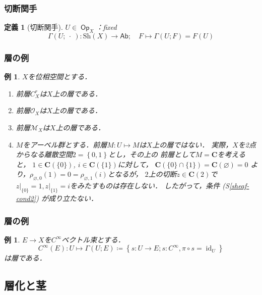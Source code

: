 \documentclass[dvipdfmx,10pt,aspectratio=169,leqno]{beamer}%
\newcommand{\cc}{\mathbf{C}}
\newcommand{\Ab}{{\mathsf{Ab}}}
\numberwithin{equation}{subsection}
\newcommand{\Op}{\mathop{\textsf{Op}}\nolimits}
\newcommand{\id}{\mathop{\mathrm{id}}\nolimits}
\newcommand{\Sh}{\mathrm{Sh}}
\newcommand{\blk}{\mathord{\ \cdot\ }}
\theoremstyle{mystyle}
\newtheorem{DFN}[AXM]{定義}
\newtheorem{EG}[AXM]{例}
\begin{document}
\begin{frame}
    \frametitle{切断関手}

    \begin{DFN}[切断関手]
        \(U\in\Op_{X}\)：fixed
        \[
            \Gamma(U;\blk)\colon \Sh(X)\to \Ab;\quad F\mapsto
            \Gamma(U;F)=F(U)
        \]
    \end{DFN}    
\end{frame}



\begin{frame}
    \frametitle{層の例}
    \begin{EG}\label{eg:sheaf}
        \(X\)を位相空間とする．
        \begin{enumerate}
            \item 前層\(C_X^r\)は\(X\)上の層である．
            \item 前層\(\mathscr{O}_X\)は\(X\)上の層である．
            \item 前層\(\mathscr{M}_X\)は\(X\)上の層である．
            \item \(M\)をアーベル群とする．前層\(M\colon U\mapsto M\)は\(X\)上の層ではない．
            実際，\(X\)を2点からなる離散空間\(2=\left\{0,1\right\}\)とし，その上の
            前層として\(M=\cc\)を考えると，
            \(1\in\cc(\{0\})\), \(i\in\cc(\{1\})\)に対して，
            \(\cc(\{0\}\cap\{1\})=\cc(\varnothing)=0\)
            より，\(\rho_{\varnothing,{0}}(1)=0
            =\rho_{\varnothing,{1}}(i)\)となるが，
            \(2\)上の切断\(z\in\cc(2)\)で\(z\rvert_{\{0\}}=1,
            z\rvert_{\{1\}}=i\)をみたすものは存在しない．
            したがって，条件 (S\ref{sheaf-cond2}) が成り立たない．\label{eg:non-sheaf}
        \end{enumerate}
    \end{EG}    
\end{frame}

\begin{frame}
    \frametitle{層の例}
    \begin{EG}
        \(E\to X\)を\(C^{\infty}\)ベクトル束とする．
        \[
            C^{\infty}(E)\colon U\mapsto \Gamma(U;E)\coloneqq
            \left\{s\colon U\to E;s\colon C^{\infty}, \pi\circ s=\id_U\right\}
        \]は層である．
    \end{EG}
\end{frame}


\subsection{層化と茎}
\end{document}
